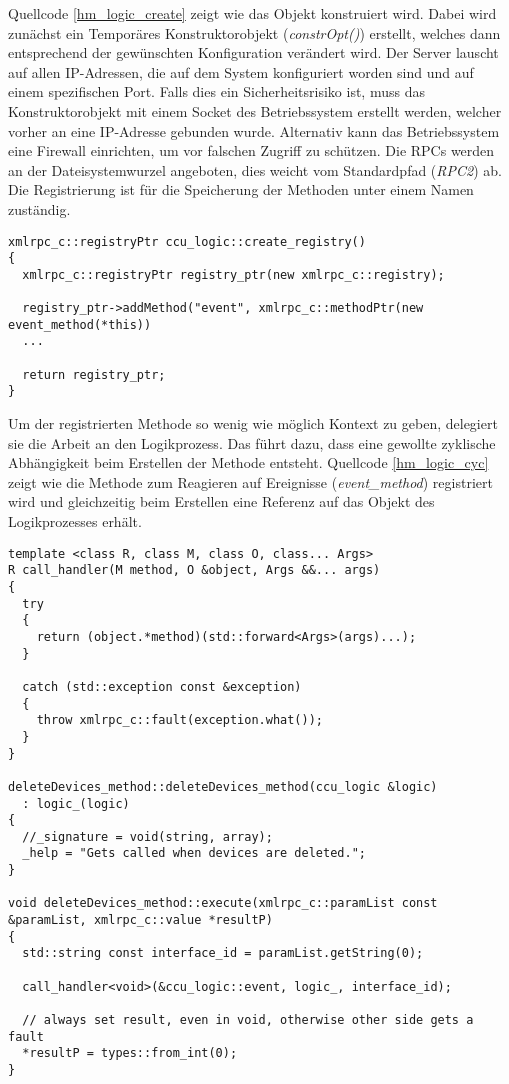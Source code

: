 Quellcode \ref{hm_logic_create} zeigt wie das Objekt konstruiert wird.
Dabei wird zunächst ein Temporäres Konstruktorobjekt (\emph{constrOpt()}) erstellt, welches dann entsprechend
der gewünschten Konfiguration verändert wird.
Der Server lauscht auf allen IP-Adressen, die auf dem System konfiguriert worden sind und auf einem
spezifischen Port.
Falls dies ein Sicherheitsrisiko ist, muss das Konstruktorobjekt mit einem Socket des Betriebssystem
erstellt werden, welcher vorher an eine IP-Adresse gebunden wurde.
Alternativ kann das Betriebssystem eine Firewall einrichten, um vor falschen Zugriff zu schützen.
Die RPCs werden an der Dateisystemwurzel angeboten, dies weicht vom Standardpfad (\emph{\/RPC2\/}) ab.
Die Registrierung ist für die Speicherung der Methoden unter einem Namen zuständig.

\lstset{language=C++}
\begin{lstlisting}[frame=single,caption={Registrieren von Methoden im Logikprozess},label=hm_logic_cyc]
xmlrpc_c::registryPtr ccu_logic::create_registry()
{
  xmlrpc_c::registryPtr registry_ptr(new xmlrpc_c::registry);

  registry_ptr->addMethod("event", xmlrpc_c::methodPtr(new event_method(*this))
  ...

  return registry_ptr;
}
\end{lstlisting}

Um der registrierten Methode so wenig wie möglich Kontext zu geben, delegiert sie die Arbeit an den
Logikprozess.
Das führt dazu, dass eine gewollte zyklische Abhängigkeit beim Erstellen der Methode entsteht.
Quellcode \ref{hm_logic_cyc} zeigt wie die Methode zum Reagieren auf Ereignisse (\emph{event\_method})
registriert wird und gleichzeitig beim Erstellen eine Referenz auf das Objekt des Logikprozesses erhält.

\lstset{language=C++}
\begin{lstlisting}[frame=single,caption={Implementierung der Wrapper-Methoden im Logikprozess},label=hm_logic_meth]
template <class R, class M, class O, class... Args>
R call_handler(M method, O &object, Args &&... args)
{ 
  try
  {
    return (object.*method)(std::forward<Args>(args)...);
  }

  catch (std::exception const &exception)
  {
    throw xmlrpc_c::fault(exception.what());
  }
} 

deleteDevices_method::deleteDevices_method(ccu_logic &logic)
  : logic_(logic)
{
  //_signature = void(string, array);
  _help = "Gets called when devices are deleted.";
}

void deleteDevices_method::execute(xmlrpc_c::paramList const &paramList, xmlrpc_c::value *resultP)
{
  std::string const interface_id = paramList.getString(0);

  call_handler<void>(&ccu_logic::event, logic_, interface_id);

  // always set result, even in void, otherwise other side gets a fault
  *resultP = types::from_int(0);
}
\end{lstlisting}

